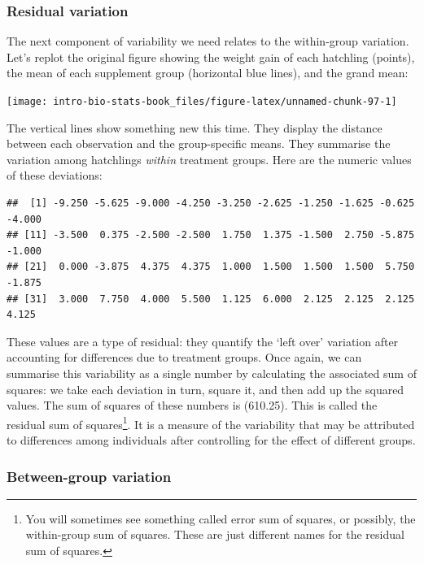 \documentclass[
]{book}
\begin{document}
\hypertarget{residual-variation-1}{%
\subsubsection*{Residual variation}\label{residual-variation-1}}

The next component of variability we need relates to the within-group variation. Let's replot the original figure showing the weight gain of each hatchling (points), the mean of each supplement group (horizontal blue lines), and the grand mean:

\begin{center}\texttt{[image: intro-bio-stats-book\_files/figure-latex/unnamed-chunk-97-1]} \end{center}

The vertical lines show something new this time. They display the distance between each observation and the group-specific means. They summarise the variation among hatchlings \emph{within} treatment groups. Here are the numeric values of these deviations:

\begin{verbatim}
##  [1] -9.250 -5.625 -9.000 -4.250 -3.250 -2.625 -1.250 -1.625 -0.625 -4.000
## [11] -3.500  0.375 -2.500 -2.500  1.750  1.375 -1.500  2.750 -5.875 -1.000
## [21]  0.000 -3.875  4.375  4.375  1.000  1.500  1.500  1.500  5.750 -1.875
## [31]  3.000  7.750  4.000  5.500  1.125  6.000  2.125  2.125  2.125  4.125
\end{verbatim}

These values are a type of residual: they quantify the `left over' variation after accounting for differences due to treatment groups. Once again, we can summarise this variability as a single number by calculating the associated sum of squares: we take each deviation in turn, square it, and then add up the squared values. The sum of squares of these numbers is (610.25). This is called the residual sum of squares\footnote{You will sometimes see something called error sum of squares, or possibly, the within-group sum of squares. These are just different names for the residual sum of squares.}. It is a measure of the variability that may be attributed to differences among individuals after controlling for the effect of different groups.

\hypertarget{between-group-variation}{%
\subsubsection*{Between-group variation}\label{between-group-variation}}
\end{document}

